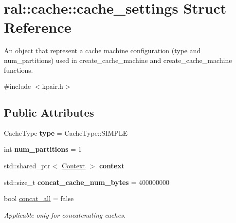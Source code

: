 \hypertarget{structral_1_1cache_1_1cache__settings}{}\section{ral\+:\+:cache\+:\+:cache\+\_\+settings Struct Reference}
\label{structral_1_1cache_1_1cache__settings}


An object that represent a cache machine configuration (type and num\+\_\+partitions) used in create\+\_\+cache\+\_\+machine and create\+\_\+cache\+\_\+machine functions.  




{\ttfamily \#include $<$kpair.\+h$>$}

\subsection*{Public Attributes}
\begin{DoxyCompactItemize}
\item 
\mbox{\label{structral_1_1cache_1_1cache__settings_a9b3e3c655751cd121cd5a6ed169c0be0}} 
Cache\+Type {\bfseries type} = Cache\+Type\+::\+S\+I\+M\+P\+LE
\item 
\mbox{\label{structral_1_1cache_1_1cache__settings_a20bbad604695b4a4e97f0e53c4c99178}} 
int {\bfseries num\+\_\+partitions} = 1
\item 
\mbox{\label{structral_1_1cache_1_1cache__settings_aa9cc6ee9667f1aaf89e03952f8a2a822}} 
std\+::shared\+\_\+ptr$<$ \hyperlink{classblazingdb_1_1manager_1_1Context}{Context} $>$ {\bfseries context}
\item 
\mbox{\label{structral_1_1cache_1_1cache__settings_a6d157349c6a1c19fe1c4d0368814fb70}} 
std\+::size\+\_\+t {\bfseries concat\+\_\+cache\+\_\+num\+\_\+bytes} = 400000000
\item 
\mbox{\label{structral_1_1cache_1_1cache__settings_acac908087611fef1560d36be68f1e418}} 
bool \hyperlink{structral_1_1cache_1_1cache__settings_acac908087611fef1560d36be68f1e418}{concat\+\_\+all} = false
\begin{DoxyCompactList}\small\item\em Applicable only for concatenating caches. \end{DoxyCompactList}\end{DoxyCompactItemize}


